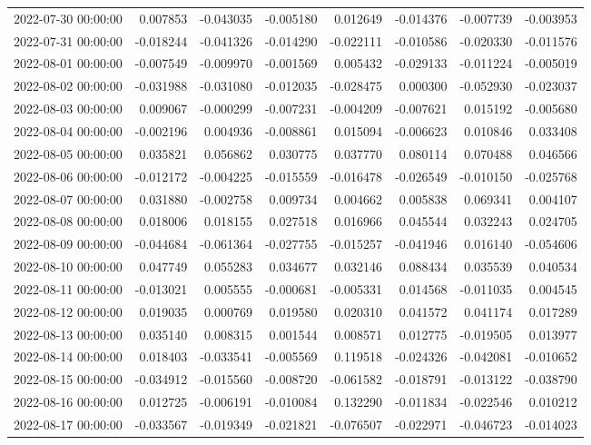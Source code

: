 \begin{tabular}{lrrrrrrr}
2022-07-30 00:00:00 & 0.007853 & -0.043035 & -0.005180 & 0.012649 & -0.014376 & -0.007739 & -0.003953 \\
2022-07-31 00:00:00 & -0.018244 & -0.041326 & -0.014290 & -0.022111 & -0.010586 & -0.020330 & -0.011576 \\
2022-08-01 00:00:00 & -0.007549 & -0.009970 & -0.001569 & 0.005432 & -0.029133 & -0.011224 & -0.005019 \\
2022-08-02 00:00:00 & -0.031988 & -0.031080 & -0.012035 & -0.028475 & 0.000300 & -0.052930 & -0.023037 \\
2022-08-03 00:00:00 & 0.009067 & -0.000299 & -0.007231 & -0.004209 & -0.007621 & 0.015192 & -0.005680 \\
2022-08-04 00:00:00 & -0.002196 & 0.004936 & -0.008861 & 0.015094 & -0.006623 & 0.010846 & 0.033408 \\
2022-08-05 00:00:00 & 0.035821 & 0.056862 & 0.030775 & 0.037770 & 0.080114 & 0.070488 & 0.046566 \\
2022-08-06 00:00:00 & -0.012172 & -0.004225 & -0.015559 & -0.016478 & -0.026549 & -0.010150 & -0.025768 \\
2022-08-07 00:00:00 & 0.031880 & -0.002758 & 0.009734 & 0.004662 & 0.005838 & 0.069341 & 0.004107 \\
2022-08-08 00:00:00 & 0.018006 & 0.018155 & 0.027518 & 0.016966 & 0.045544 & 0.032243 & 0.024705 \\
2022-08-09 00:00:00 & -0.044684 & -0.061364 & -0.027755 & -0.015257 & -0.041946 & 0.016140 & -0.054606 \\
2022-08-10 00:00:00 & 0.047749 & 0.055283 & 0.034677 & 0.032146 & 0.088434 & 0.035539 & 0.040534 \\
2022-08-11 00:00:00 & -0.013021 & 0.005555 & -0.000681 & -0.005331 & 0.014568 & -0.011035 & 0.004545 \\
2022-08-12 00:00:00 & 0.019035 & 0.000769 & 0.019580 & 0.020310 & 0.041572 & 0.041174 & 0.017289 \\
2022-08-13 00:00:00 & 0.035140 & 0.008315 & 0.001544 & 0.008571 & 0.012775 & -0.019505 & 0.013977 \\
2022-08-14 00:00:00 & 0.018403 & -0.033541 & -0.005569 & 0.119518 & -0.024326 & -0.042081 & -0.010652 \\
2022-08-15 00:00:00 & -0.034912 & -0.015560 & -0.008720 & -0.061582 & -0.018791 & -0.013122 & -0.038790 \\
2022-08-16 00:00:00 & 0.012725 & -0.006191 & -0.010084 & 0.132290 & -0.011834 & -0.022546 & 0.010212 \\
2022-08-17 00:00:00 & -0.033567 & -0.019349 & -0.021821 & -0.076507 & -0.022971 & -0.046723 & -0.014023 \\

\end{tabular}
